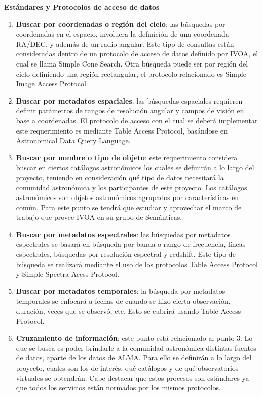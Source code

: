 \textbf{Estándares y Protocolos de acceso de datos} \begin{enumerate} \item
\textbf{Buscar por coordenadas o región del cielo}: las búsquedas por
coordenadas en el espacio, involucra la definición de una coordenada RA/DEC, y
además de un radio angular. Este tipo de consultas están consideradas dentro de
un protocolo de acceso de datos definido por IVOA, el cual se llama Simple Cone
Search.  Otra búsqueda puede ser por región del cielo definiendo una región
rectangular, el protocolo relacionado es Simple Image Access Protocol.

	\item \textbf{Buscar por metadatos espaciales}: las búsquedas
espaciales requieren definir parámetros de rangos de resolución angular y
campos de visión en base a coordenadas. El protocolo de acceso con el cual se
deberá implementar este requerimiento es mediante Table Access Protocol,
basándose en Astronomical Data Query Language.

	\item \textbf{Buscar por nombre o tipo de objeto}: este requerimiento
considera buscar en ciertos catálogos astronómicos los cuales se definirán a lo
largo del proyecto, teniendo en consideración qué tipo de datos necesitará la
comunidad astronómica y los participantes de este proyecto. Los catálogos
astronómicos son objetos astronómicos agrupados por características en común.
Para este punto se tendrá que estudiar y aprovechar el marco de trabajo que
provee IVOA en su grupo de Semánticas.

	\item \textbf{Buscar por metadatos espectrales}: las búsquedas por
metadatos espectrales se basará en búsqueda por banda o rango de frecuencia,
líneas espectrales, búsquedas por resolución espectral y redshift. Este tipo de
búsqueda se realizará mediante el uso de los protocolos Table Access Protocol y
Simple Spectra Acess Protocol.

	\item \textbf{Buscar por metadatos temporales}: la búsqueda por
metadatos temporales se enfocará a fechas de cuando se hizo cierta observación,
duración, veces que se observó, etc. Esto se cubrirá usando Table Access
Protocol.

	\item \textbf{Cruzamiento de información}: este punto está relacionado
al punto 3. Lo que se busca es poder brindarle a la comunidad astronómica
distintas fuentes de datos, aparte de los datos de ALMA. Para ello se definirán
a lo largo del proyecto, cuales son los de interés, qué catálogos y de qué
observatorios virtuales se obtendrán. Cabe destacar que estos procesos son
estándares ya que todos los servicios están normados por los mismos protocolos.


\end{enumerate}
